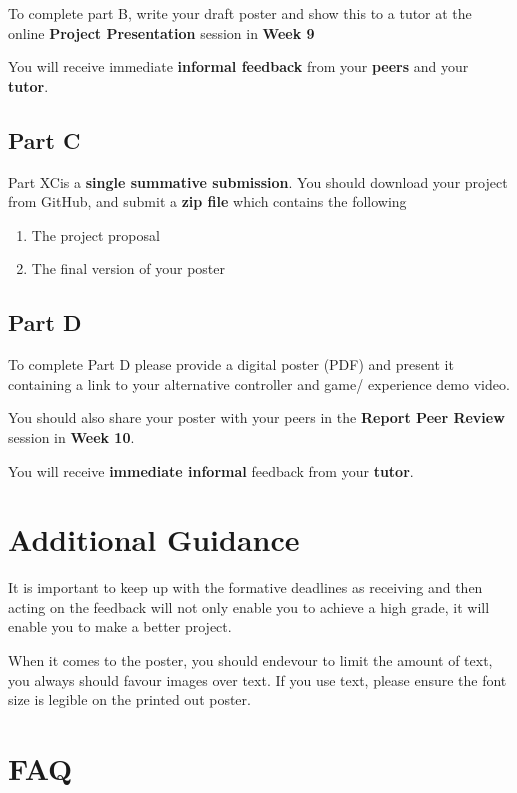 \documentclass{../../fal_assignment}
\begin{document}
To complete part B, write your draft poster and show this to a tutor at the online \textbf{Project Presentation} session in \textbf{Week 9}

You will receive immediate \textbf{informal feedback} from your \textbf{peers} and your \textbf{tutor}.

\subsection*{Part C}

Part XCis a \textbf{single summative submission}. You should download your project from GitHub, and submit a \textbf{zip file} which contains the following

	\begin{enumerate}
	\item The project proposal
	\item The final version of your poster
	\end{enumerate}

\subsection*{Part D}

	To complete Part D please provide a digital poster (PDF) and present it containing a link to your alternative controller and game/ experience demo video.
	
	You should also share your poster with your peers in the \textbf{Report Peer Review} session in \textbf{Week 10}. 

	You will receive \textbf{immediate informal} feedback from your \textbf{tutor}.

\section*{Additional Guidance}
It is important to keep up with the formative deadlines as receiving and then acting on the feedback 
will not only enable you to achieve a high grade, it will enable you to make a better project. 

When it comes to the poster, you should endevour to limit the amount of text, 
you always should favour images over text. If you use text, please ensure the 
font size is legible on the printed out poster.

\section*{FAQ}
\end{document}
